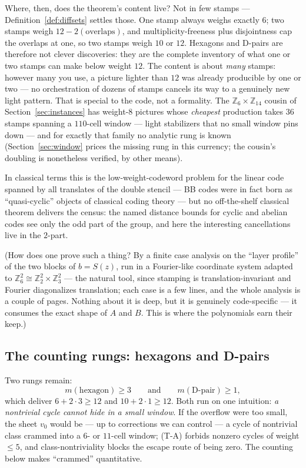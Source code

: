 \documentclass[11pt]{article}
\theoremstyle{plain}
\theoremstyle{definition}
\theoremstyle{remark}
\newcommand{\Z}{\mathbb{Z}}
\begin{document}
Where, then, does the theorem's content live? Not in few stamps ---
Definition~\ref{def:diffsets} settles those. One stamp always weighs
exactly $6$; two stamps weigh $12 - 2(\text{overlaps})$, and
multiplicity-freeness plus disjointness cap the overlaps at one, so two
stamps weigh $10$ or $12$. Hexagons and D-pairs are therefore not clever
discoveries: they are the complete inventory of what one or two stamps can
make below weight $12$. The content is about \emph{many} stamps: however
many you use, a picture lighter than $12$ was already producible by one or
two --- no orchestration of dozens of stamps cancels its way to a genuinely
new light pattern. That is special to the code, not a formality. The
$\Z_6 \times \Z_{14}$ cousin of Section~\ref{sec:instances} has
weight-$8$ pictures whose \emph{cheapest} production takes $36$ stamps
spanning a $110$-cell window --- light stabilizers that no small window
pins down --- and for exactly that family no analytic rung is known
(Section~\ref{sec:window} prices the missing rung in this currency; the
cousin's doubling is nonetheless verified, by other means).

In classical terms this is the low-weight-codeword problem for the linear
code spanned by all translates of the double stencil --- BB codes were in
fact born as ``quasi-cyclic'' objects of classical coding theory
\cite{kovalevpryadko} --- but no off-the-shelf classical theorem delivers
the census: the named distance bounds for cyclic and abelian codes see only
the odd part of the group, and here the interesting cancellations live in
the $2$-part.

(How does one prove such a thing? By a finite case analysis on the ``layer
profile'' of the two blocks of $b = S(z)$, run in a Fourier-like coordinate
system adapted to $\Z_6^2 \cong \Z_2^2 \times \Z_3^2$ --- the natural tool,
since stamping is translation-invariant and Fourier diagonalizes
translation; each case is a few lines, and the whole analysis is a couple
of pages. Nothing about it is deep, but it is genuinely code-specific ---
it consumes the exact shape of $A$ and $B$. This is where the polynomials
earn their keep.)

\subsection{The counting rungs: hexagons and D-pairs}

Two rungs remain:
\[
m(\text{hexagon}) \geq 3
\qquad\text{and}\qquad
m(\text{D-pair}) \geq 1 ,
\]
which deliver $6 + 2 \cdot 3 \geq 12$ and $10 + 2 \cdot 1 \geq 12$. Both
run on one intuition: \emph{a nontrivial cycle cannot hide in a small
window}. If the overflow were too small, the sheet $v_0$ would be --- up
to corrections we can control --- a cycle of nontrivial class crammed into
a $6$- or $11$-cell window; (T-A) forbids nonzero cycles of weight
$\leq 5$, and class-nontriviality blocks the escape route of being zero.
The counting below makes ``crammed'' quantitative.
\end{document}
